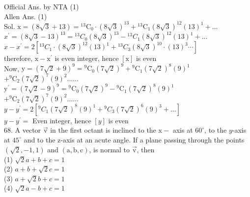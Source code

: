\documentclass[10pt]{article}
\begin{document}
Official Ans. by NTA (1)\\
Allen Ans. (1)\\
Sol. \(\mathrm{x}=(8 \sqrt{3}+13)={ }^{13} \mathrm{C}_{0} \cdot(8 \sqrt{3})^{13}+{ }^{13} \mathrm{C}_{1}(8 \sqrt{3})^{12}(13)^{1}+\ldots\)\\
\(x^{\prime}=(8 \sqrt{3}-13)^{13}={ }^{13} C_{0}(8 \sqrt{3})^{13}-{ }^{13} C_{1}(8 \sqrt{3})^{12}(13)^{1}+\ldots\)\\
\(x-x^{\prime}=2\left[{ }^{13} C_{1} \cdot(8 \sqrt{3})^{12}(13)^{1}+{ }^{13} C_{3}(8 \sqrt{3})^{10} \cdot(13)^{3} \cdots\right]\)\\
therefore, \(\mathrm{x}-\mathrm{x}^{\prime}\) is even integer, hence \([\mathrm{x}]\) is even\\
Now, \(\mathrm{y}=(7 \sqrt{2}+9)^{9}={ }^{9} \mathrm{C}_{0}(7 \sqrt{2})^{9}+{ }^{9} \mathrm{C}_{1}(7 \sqrt{2})^{8}(9)^{1}\)\\
\(+{ }^{9} \mathrm{C}_{2}(7 \sqrt{2})^{7}(9)^{2} \ldots \ldots\)\\
\(\mathrm{y}^{\prime}=(7 \sqrt{2}-9)^{9}={ }^{9} \mathrm{C}_{0}(7 \sqrt{2})^{9}-{ }^{9} \mathrm{C}_{1}(7 \sqrt{2})^{8}(9)^{1}\)\\
\(+{ }^{9} \mathrm{C}_{2}(7 \sqrt{2})^{7}(9)^{2} \ldots \ldots\)\\
\(y-y^{\prime}=2\left[{ }^{9} C_{1}(7 \sqrt{2})^{8}(9)^{1}+{ }^{9} C_{3}(7 \sqrt{2})^{6}(9)^{3}+\ldots\right]\)\\
\(y-y^{\prime}=\) Even integer, hence \([y]\) is even\\
68. A vector \(\overrightarrow{\mathrm{v}}\) in the first octant is inclined to the \(\mathrm{x}-\) axis at \(60^{\circ}\), to the \(y\)-axis at \(45^{\circ}\) and to the z-axis at an acute angle. If a plane passing through the points \((\sqrt{2},-1,1)\) and \((\mathrm{a}, \mathrm{b}, \mathrm{c})\), is normal to \(\overrightarrow{\mathrm{v}}\), then\\
(1) \(\sqrt{2} a+b+c=1\)\\
(2) \(a+b+\sqrt{2} c=1\)\\
(3) \(a+\sqrt{2} b+c=1\)\\
(4) \(\sqrt{2} a-b+c=1\)
\end{document}
